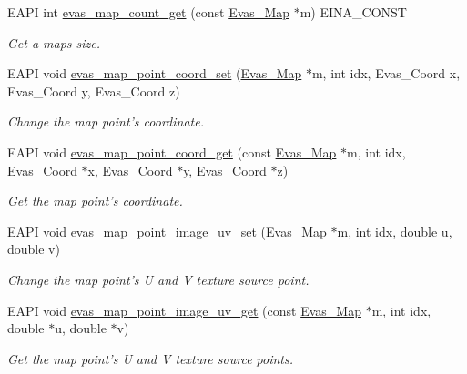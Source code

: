 \begin{DoxyCompactItemize}
EAPI int \hyperlink{Evas_8h_acb6da0be6c78ebf89a5b25d9a0fa44fa}{evas\_\-map\_\-count\_\-get} (const \hyperlink{group__Evas__Object__Group__Map_gae94fcea124ae4135e8bb15a014b334dc}{Evas\_\-Map} $\ast$m) EINA\_\-CONST
\begin{DoxyCompactList}\small\item\em Get a maps size. \item\end{DoxyCompactList}\item 
EAPI void \hyperlink{Evas_8h_acc9bdfa50e0344928f070aef0cf7a8b7}{evas\_\-map\_\-point\_\-coord\_\-set} (\hyperlink{group__Evas__Object__Group__Map_gae94fcea124ae4135e8bb15a014b334dc}{Evas\_\-Map} $\ast$m, int idx, Evas\_\-Coord x, Evas\_\-Coord y, Evas\_\-Coord z)
\begin{DoxyCompactList}\small\item\em Change the map point's coordinate. \item\end{DoxyCompactList}\item 
EAPI void \hyperlink{Evas_8h_ab8640a9b915b7c6f33f96782bb23e939}{evas\_\-map\_\-point\_\-coord\_\-get} (const \hyperlink{group__Evas__Object__Group__Map_gae94fcea124ae4135e8bb15a014b334dc}{Evas\_\-Map} $\ast$m, int idx, Evas\_\-Coord $\ast$x, Evas\_\-Coord $\ast$y, Evas\_\-Coord $\ast$z)
\begin{DoxyCompactList}\small\item\em Get the map point's coordinate. \item\end{DoxyCompactList}\item 
EAPI void \hyperlink{Evas_8h_a1ce926660d27e788b469f8a202dfb84a}{evas\_\-map\_\-point\_\-image\_\-uv\_\-set} (\hyperlink{group__Evas__Object__Group__Map_gae94fcea124ae4135e8bb15a014b334dc}{Evas\_\-Map} $\ast$m, int idx, double u, double v)
\begin{DoxyCompactList}\small\item\em Change the map point's U and V texture source point. \item\end{DoxyCompactList}\item 
EAPI void \hyperlink{Evas_8h_ab993d154039532e6105d2c1ea23133fc}{evas\_\-map\_\-point\_\-image\_\-uv\_\-get} (const \hyperlink{group__Evas__Object__Group__Map_gae94fcea124ae4135e8bb15a014b334dc}{Evas\_\-Map} $\ast$m, int idx, double $\ast$u, double $\ast$v)
\begin{DoxyCompactList}\small\item\em Get the map point's U and V texture source points. \item\end{DoxyCompactList}\item 

\end{DoxyCompactItemize}
